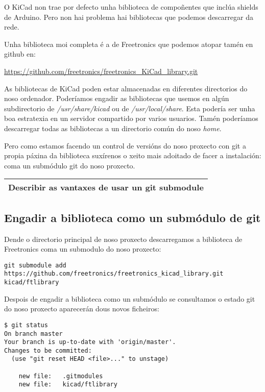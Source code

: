 O KiCad non trae por defecto unha biblioteca de compoñentes que inclúa
shields de Arduino. Pero non hai problema hai bibliotecas que podemos
descarregar da rede.

Unha biblioteca moi completa é a de Freetronics que podemos atopar tamén
en github en:

\url{https://github.com/freetronics/freetronics_KiCad_library.git}

As bibliotecas de KiCad poden estar almacenadas en diferentes
directorios do noso ordenador. Poderíamos engadir as bibliotecas que
usemos en algún subdirectorio de \emph{/usr/share/kicad} ou de
\emph{/usr/local/share}. Esta podería ser unha boa estratexia en un
servidor compartido por varios usuarios. Tamén poderíamos descarregar
todas as bibliotecas a un directorio común do noso \emph{home}.

Pero como estamos facendo un control de versións do noso proxecto con
git a propia páxina da biblioteca suxírenos o xeito mais adoitado de
facer a instalación: coma un submódulo git do noso proxecto.

\begin{longtable}[c]{@{}l@{}}
\toprule
Describir as vantaxes de usar un git submodule\tabularnewline
\bottomrule
\end{longtable}

\subsection{Engadir a biblioteca como un submódulo de
git}\label{engadir-a-biblioteca-como-un-submuxf3dulo-de-git}

Dende o directorio principal de noso proxecto descarregamos a biblioteca
de Freetronics coma un submodulo do noso proxecto:

\begin{verbatim}
git submodule add https://github.com/freetronics/freetronics_kicad_library.git kicad/ftlibrary
\end{verbatim}

Despois de engadir a biblioteca como un submódulo se consultamos o
estado git do noso proxecto aparecerán dous novos ficheiros:

\begin{verbatim}
$ git status
On branch master
Your branch is up-to-date with 'origin/master'.
Changes to be committed:
  (use "git reset HEAD <file>..." to unstage)

    new file:   .gitmodules
    new file:   kicad/ftlibrary
\end{verbatim}

